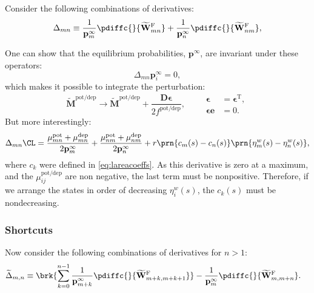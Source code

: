 \documentclass[12pt]{article}
\newcommand{\trans}{^\mathrm{T}}
\newcommand{\onev}{\mathbf{e}}
\newcommand{\pr}{\mathbf{p}}
\newcommand{\eq}{\pr^\infty}
\newcommand{\D}{\mathbf{D}}
\newcommand{\W}{\mathbf{W}}
\newcommand{\M}{\mathbf{M}}
\newcommand{\pot}{^{\text{pot}}}
\newcommand{\dep}{^{\text{dep}}}
\newcommand{\potdep}{^{\text{pot/dep}}}
\newcommand{\Mh}{\widetilde{\M}}
\newcommand{\frgh}{\widetilde{\W}^{\mathrm{F}}}
\begin{document}
Consider the following combinations of derivatives:
%
\begin{equation}\label{eq:areacoeffincrderiv}
    \Delta_{mn} \equiv
      \frac{1}{\eq_{m}} \pdiffc{}{\frgh_{mn}}
      + \frac{1}{\eq_n} \pdiffc{}{\frgh_{nm}}, 
\end{equation}
%

One can show that the equilibrium probabilities, $\eq$, are invariant under these operators:
%
\begin{equation}\label{eq:sareacoeffincrprob}
  \Delta_{mn} \eq_i = 0,
\end{equation}
%
which makes it possible to integrate the perturbation:
%
\begin{equation}\label{eq:areacoeffincrfinite}
  \Mh\potdep \to \Mh\potdep + \frac{\D\boldsymbol{\epsilon}}{2f\potdep},
  \qquad
  \begin{aligned}
  \boldsymbol{\epsilon} &= \boldsymbol{\epsilon}\trans,
  \\
  \boldsymbol{\epsilon} \onev &= 0.
  \end{aligned}
\end{equation}
%
But more interestingly:
%
\begin{align}
\label{eq:areacoeffincr}
    \Delta_{mn}\CL &=
      \frac{\mu\pot_{mn} + \mu\dep_{mn}}{2\eq_m} + \frac{\mu\pot_{nm} + \mu\dep_{nm}}{2\eq_n}
      + r\prn{c_m(s)-c_n(s)}\prn{\eta^w_{m}(s) - \eta^w_{n}(s)},\\
\end{align}
%
where $c_k$ were defined in \eqref{eq:lareacoeffs}.
As this derivative is zero at a maximum, and the $\mu\potdep_{ij}$ are non negative, the last term must be nonpositive.
Therefore, if we arrange the states in order of decreasing $\eta^w_i(s)$, the $c_k(s)$ must be nondecreasing.


\subsubsection{Shortcuts}\label{sec:shortcuts}

Now consider the following combinations of derivatives for $n>1$:
%
\begin{align}
\label{eq:shortcutderiv}
    \widetilde{\Delta}_{m,n} &\equiv
      \brk{ \sum_{k=0}^{n-1} \frac{1}{\eq_{m+k}} \pdiffc{}{\frgh_{m+k,m+k+1}} }
      - \frac{1}{\eq_m} \pdiffc{}{\frgh_{m,m+ n}}.
\end{align}
%
\end{document}
